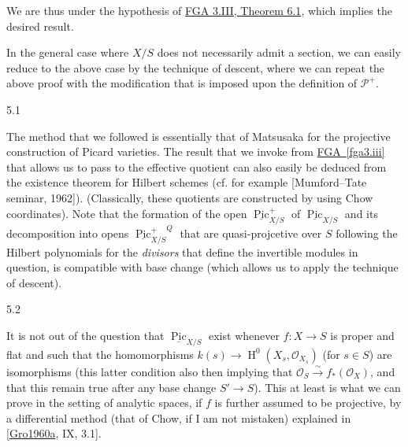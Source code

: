   We are thus under the hypothesis of \hyperref[fga3.iii-6-theorem-6.1]{FGA 3.III, Theorem 6.1}, which implies the desired result.\par{}In the general case where \(X/S\) does not necessarily admit a section, we can easily reduce to the above case by the technique of descent, where we can repeat the above proof with the modification that is imposed upon the definition of \(\mathscr {P}^+\).\begin{remarks}{5.1}\label{fga3.v-5-remarks-5.1}\skipsinglepar\par{}The method that we followed is essentially that of Matsusaka for the projective construction of Picard varieties.
    The result that we invoke from \hyperref[fga3.iii]{FGA~\ref*{fga3.iii}} that allows us to pass to the effective quotient can also easily be deduced from the existence theorem for Hilbert schemes (cf. for example [Mumford–Tate seminar, 1962]).
    (Classically, these quotients are constructed by using Chow coordinates).
    Note that the formation of the open \(\underline {\operatorname {Pic}}_{X/S}^+\) of \(\underline {\operatorname {Pic}}_{X/S}\) and its decomposition into opens \({\underline {\operatorname {Pic}}_{X/S}^+}^Q\) that are quasi-projcetive over \(S\) following the Hilbert polynomials for the \emph{divisors} that define the invertible modules in question, is compatible with base change (which allows us to apply the technique of descent).\end{remarks}\begin{remarks}{5.2}\label{fga3.v-5-remarks-5.2}\skipsinglepar\par{}It is not out of the question that \(\underline {\operatorname {Pic}}_{X/S}\) exist whenever \(f\colon  X\to  S\) is proper and flat and such that the homomorphisms \(k(s)\to \operatorname {H}^0(X_s,\mathcal {O}_{X_s})\) (for \(s\in  S\)) are isomorphisms (this latter condition also then implying that \(\mathcal {O}_S\xrightarrow {\sim } f_*(\mathcal {O}_X)\), and that this remain true after any base change \(S'\to  S\)).
    This at least is what we can prove in the setting of analytic spaces, if \(f\) is further assumed to be projective, by a differential method (that of Chow, if I am not mistaken) explained in [\hyperref[Gro1960a]{Gro1960a}, IX, 3.1].
    

\end{remarks}
